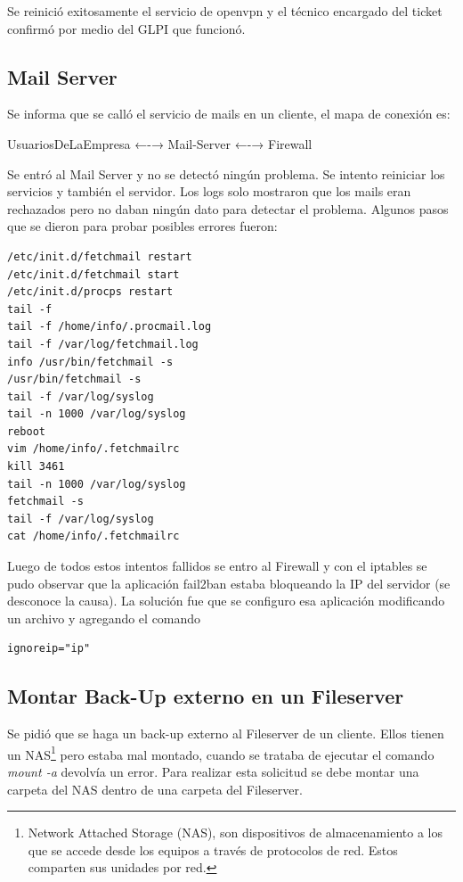 \documentclass[12pt,a4paper]{article}
\begin{document}
Se reinició exitosamente el servicio de openvpn y el técnico encargado del ticket confirmó por medio del GLPI que funcionó.

\subsection{Mail Server} 
Se informa que se calló el servicio de mails en un cliente, el mapa de conexión es:

\begin{center}
UsuariosDeLaEmpresa ←-→ Mail-Server ←-→ Firewall
\end{center}

Se entró al Mail Server y no se detectó ningún problema. Se intento reiniciar los servicios y también el servidor. Los logs solo mostraron que los mails eran rechazados pero no daban ningún dato para detectar el problema. Algunos pasos que se dieron para probar posibles errores fueron:

\begin{lstlisting}
/etc/init.d/fetchmail restart
/etc/init.d/fetchmail start 
/etc/init.d/procps restart
tail -f
tail -f /home/info/.procmail.log
tail -f /var/log/fetchmail.log
info /usr/bin/fetchmail -s
/usr/bin/fetchmail -s
tail -f /var/log/syslog
tail -n 1000 /var/log/syslog
reboot
vim /home/info/.fetchmailrc 
kill 3461
tail -n 1000 /var/log/syslog
fetchmail -s
tail -f /var/log/syslog
cat /home/info/.fetchmailrc 
\end{lstlisting}

Luego de todos estos intentos fallidos se entro al Firewall y con el iptables se pudo observar que la aplicación fail2ban estaba bloqueando la IP del servidor (se desconoce la causa). La solución fue que se configuro esa aplicación modificando un archivo y agregando el comando

\begin{lstlisting}
ignoreip="ip"
\end{lstlisting}

\subsection{Montar Back-Up externo en un Fileserver} 
Se pidió que se haga un back-up externo al Fileserver de un cliente. Ellos tienen un NAS\footnote{Network Attached Storage (NAS), son dispositivos de almacenamiento a los que se accede desde los equipos a través de protocolos de red. Estos comparten sus unidades por red.}  pero estaba mal montado, cuando se trataba de ejecutar el comando \textit{mount -a} devolvía un error. Para realizar esta solicitud se debe montar una carpeta del NAS dentro de una carpeta del Fileserver.
\end{document}
